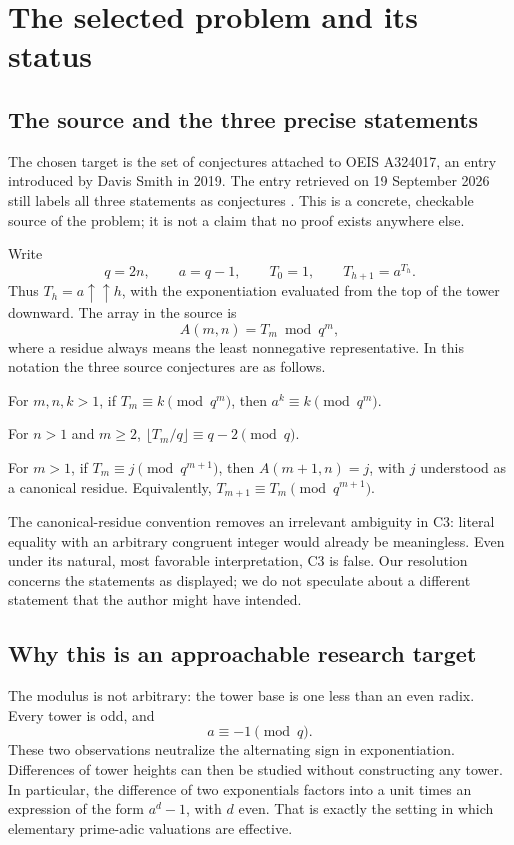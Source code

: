 \documentclass[11pt,a4paper]{article}
\numberwithin{equation}{section}
\theoremstyle{plain}
\theoremstyle{definition}
\begin{document}
\clearpage
\tableofcontents
\clearpage

\section{The selected problem and its status}\label{sec:question}

\subsection{The source and the three precise statements}
The chosen target is the set of conjectures attached to OEIS A324017,
an entry introduced by Davis Smith in 2019.  The entry retrieved on
19 September 2026 still labels all three statements as conjectures
\cite{oeis}.  This is a concrete, checkable source of the problem;
it is not a claim that no proof exists anywhere else.

Write
\begin{equation}\label{eq:setup}
 q=2n,\qquad a=q-1,\qquad T_0=1,\qquad T_{h+1}=a^{T_h}.
\end{equation}
Thus $T_h=a\uparrow\uparrow h$, with the exponentiation evaluated from
the top of the tower downward.  The array in the source is
\[
 A(m,n)=T_m\bmod q^m,
\]
where a residue always means the least nonnegative representative.
In this notation the three source conjectures are as follows.

\begin{description}[leftmargin=12mm,style=nextline]
\item[C1: fixed point.]
For $m,n,k>1$, if $T_m\equiv k\pmod{q^m}$, then
$a^k\equiv k\pmod{q^m}$.
\item[C2: second digit.]
For $n>1$ and $m\ge2$,
$\lfloor T_m/q\rfloor\equiv q-2\pmod q$.
\item[C3: early stabilization.]
For $m>1$, if $T_m\equiv j\pmod{q^{m+1}}$, then
$A(m+1,n)=j$, with $j$ understood as a canonical residue.
Equivalently, $T_{m+1}\equiv T_m\pmod{q^{m+1}}$.
\end{description}

The canonical-residue convention removes an irrelevant ambiguity in
C3: literal equality with an arbitrary congruent integer would already
be meaningless.  Even under its natural, most favorable interpretation,
C3 is false.  Our resolution concerns the statements as displayed;
we do not speculate about a different statement that the author might
have intended.

\subsection{Why this is an approachable research target}
The modulus is not arbitrary: the tower base is one less than an even
radix.  Every tower is odd, and
\[
 a\equiv-1\pmod q.
\]
These two observations neutralize the alternating sign in exponentiation.
Differences of tower heights can then be studied without constructing
any tower.  In particular, the difference of two exponentials factors
into a unit times an expression of the form $a^d-1$, with $d$ even.
That is exactly the setting in which elementary prime-adic valuations
are effective.
\end{document}
